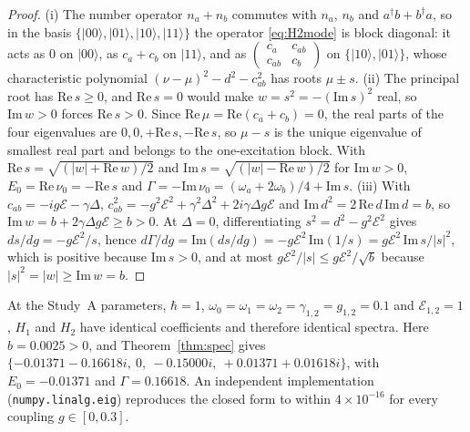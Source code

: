 \documentclass[conference]{IEEEtran}
\newcommand{\cE}{\mathcal{E}}
\newcommand{\ad}{^{\dagger}}
\begin{document}
\begin{proof}
(i) The number operator $n_a+n_b$ commutes with $n_a$, $n_b$ and $a\ad b+b\ad a$, so in the basis $\{|00\rangle,|01\rangle,|10\rangle,|11\rangle\}$ the operator \eqref{eq:H2mode} is block diagonal: it acts as $0$ on $|00\rangle$, as $c_a+c_b$ on $|11\rangle$, and as $\begin{pmatrix}c_a&c_{ab}\\c_{ab}&c_b\end{pmatrix}$ on $\{|10\rangle,|01\rangle\}$, whose characteristic polynomial $(\nu-\mu)^2-d^2-c_{ab}^2$ has roots $\mu\pm s$.
(ii) The principal root has $\mathrm{Re}\,s\ge0$, and $\mathrm{Re}\,s=0$ would make $w=s^2=-(\mathrm{Im}\,s)^2$ real, so $\mathrm{Im}\,w>0$ forces $\mathrm{Re}\,s>0$. Since $\mathrm{Re}\,\mu=\mathrm{Re}(c_a+c_b)=0$, the real parts of the four eigenvalues are $0,0,+\mathrm{Re}\,s,-\mathrm{Re}\,s$, so $\mu-s$ is the unique eigenvalue of smallest real part and belongs to the one-excitation block. With $\mathrm{Re}\,s=\sqrt{(|w|+\mathrm{Re}\,w)/2}$ and $\mathrm{Im}\,s=\sqrt{(|w|-\mathrm{Re}\,w)/2}$ for $\mathrm{Im}\,w>0$, $E_0=\mathrm{Re}\,\nu_0=-\mathrm{Re}\,s$ and $\Gamma=-\mathrm{Im}\,\nu_0=(\omega_a+2\omega_b)/4+\mathrm{Im}\,s$.
(iii) With $c_{ab}=-ig\cE-\gamma\Delta$, $c_{ab}^2=-g^2\cE^2+\gamma^2\Delta^2+2i\gamma\Delta g\cE$ and $\mathrm{Im}\,d^2=2\,\mathrm{Re}\,d\,\mathrm{Im}\,d=b$, so $\mathrm{Im}\,w=b+2\gamma\Delta g\cE\ge b>0$. At $\Delta=0$, differentiating $s^2=d^2-g^2\cE^2$ gives $ds/dg=-g\cE^2/s$, hence $d\Gamma/dg=\mathrm{Im}(ds/dg)=-g\cE^2\,\mathrm{Im}(1/s)=g\cE^2\,\mathrm{Im}\,s/|s|^2$, which is positive because $\mathrm{Im}\,s>0$, and at most $g\cE^2/|s|\le g\cE^2/\sqrt b$ because $|s|^2=|w|\ge\mathrm{Im}\,w=b$.
\end{proof}

At the Study~A parameters, $\hbar=1$, $\omega_0=\omega_1=\omega_2=\gamma_{1,2}=g_{1,2}=0.1$ and $\cE_{1,2}=1$, $H_1$ and $H_2$ have identical coefficients and therefore identical spectra. Here $b=0.0025>0$, and Theorem~\ref{thm:spec} gives $\{-0.01371-0.16618i,\ 0,\ -0.15000i,\ +0.01371+0.01618i\}$, with $E_0=-0.01371$ and $\Gamma=0.16618$. An independent implementation (\texttt{numpy.linalg.eig}) reproduces the closed form to within $4{\times}10^{-16}$ for every coupling $g\in[0,0.3]$.
\end{document}
